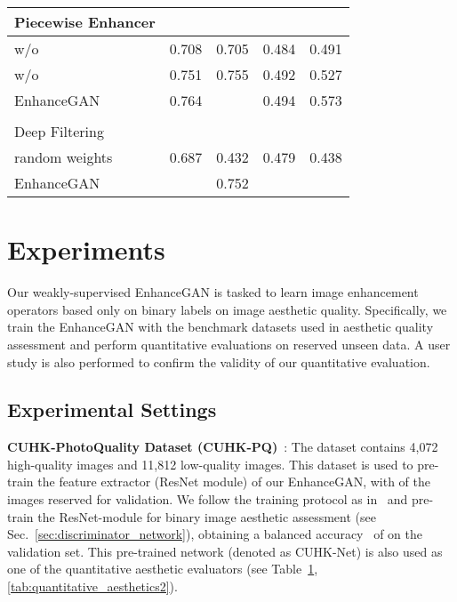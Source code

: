 \documentclass[sigconf]{acmart}
\begin{document}
\begin{table}[h]
\begin{tabular}{lcccc}
Piecewise Enhancer                                                     &            &             &               &                                                 \\ \hline
w/o                                   & 0.708     & 0.705      & 0.484        & 0.491                                         \\
w/o                        & 0.751    &  0.755      & 0.492        & 0.527                                       \\
EnhanceGAN                                                 & 0.764     &       & 0.494      & 0.573                                  \\    
                                                     &            &             &               &                                                  \\
Deep Filtering                                                     &            &             &               &                                                 \\ \hline
random weights                               & 0.687     & 0.432      & 0.479          & 0.438                                        \\
EnhanceGAN                                                &      & 0.752      &           &    \\               
\end{tabular}
\label{tab:quantitative_aesthetics1}
\vskip -0.4cm
\end{table}
\section{Experiments}
Our weakly-supervised EnhanceGAN is tasked to learn image enhancement operators based only on binary labels on image aesthetic quality. Specifically, we train the EnhanceGAN with the benchmark datasets used in aesthetic quality assessment and perform quantitative evaluations on reserved unseen data. A user study is also performed to confirm the validity of our quantitative evaluation.

\subsection{Experimental Settings}
\label{sec:dataset}
\noindent\textbf{CUHK-PhotoQuality Dataset (CUHK-PQ)}~\cite{tang2013content}: The dataset contains 4,072 high-quality images and 11,812 low-quality images. This dataset is used to pre-train the feature extractor (ResNet module) of our EnhanceGAN, with  of the images reserved for validation. We follow the training protocol as in~\cite{deng2017image} and pre-train the ResNet-module for binary image aesthetic assessment (see Sec.~\ref{sec:discriminator_network}), obtaining a balanced accuracy~\cite{deng2017image} of  on the validation set. This pre-trained network (denoted as CUHK-Net) is also used as one of the quantitative aesthetic evaluators (see Table~\ref{tab:quantitative_aesthetics1},\ref{tab:quantitative_aesthetics2}).
\end{document}
